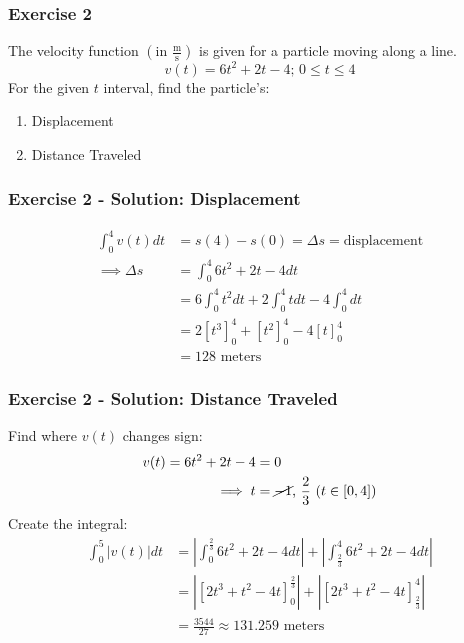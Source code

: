 \documentclass[12pt]{beamer}
\begin{document}
\begin{frame}
	\frametitle{Exercise 2}

	\large
	The velocity function $\left(\text{in }\frac{\text{m}}{\text{s}}\right)$ is given for a particle moving along a line. \\
	\[v(t)=6t^2+2t-4\text{; }0\leq t\leq 4\]
	\vfill
	For the given $t$ interval, find the particle's:
	\begin{enumerate}
		\item Displacement
		\item Distance Traveled
	\end{enumerate}
\end{frame}
\begin{frame}
	\frametitle{Exercise 2 - Solution: Displacement}

	\large
	\begin{align*}
		\int_{0}^{4}v(t)dt &= s(4)-s(0)=\Delta s=\text{displacement}\\
		\implies \Delta s &= \int_{0}^{4}6t^2+2t-4dt\\
		&= 6\int_{0}^{4}t^2dt+2\int_{0}^{4}tdt-4\int_{0}^{4}dt\\
		&= 2[t^3]_0^4+[t^2]_0^4-4[t]_0^4\\
		&= \boxed{128\text{ meters}}
	\end{align*}
\end{frame}
\begin{frame}
	\frametitle{Exercise 2 - Solution: Distance Traveled}

	Find where $v(t)$ changes sign:
	\begin{align*}
		v(t)=6t^2+2t-4&=0\\
		\implies t&=\cancel{-1}\text{, }\frac{2}{3}\text{ ($t\in [0,4]$)}
	\end{align*}
	Create the integral:
	\begin{align*}
		\int_{0}^{5}|v(t)|dt&=\left|\int_{0}^{\frac{2}{3}}6t^2+2t-4dt\right|+\left|\int_{\frac{2}{3}}^{4}6t^2+2t-4dt\right|\\
		&= \left|[2t^3+t^2-4t]_0^\frac{2}{3}\right|+\left|[2t^3+t^2-4t]_\frac{2}{3}^4\right|\\
		&= \boxed{\frac{3544}{27}\approx131.259\text{ meters}}
	\end{align*}
\end{frame}
\end{document}
